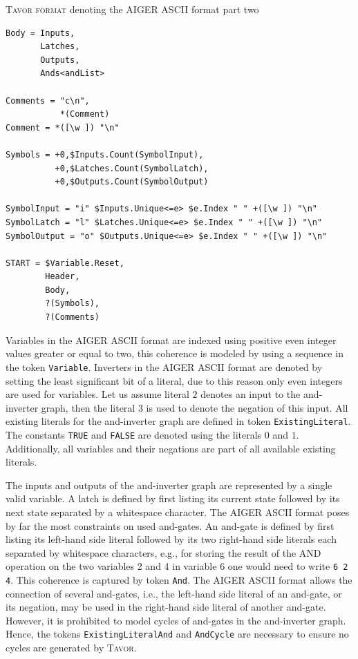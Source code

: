 \begin{listing}
\caption{\textsc{Tavor format} denoting the AIGER ASCII format part two}
\label{lst:tavor-aiger-ascii-format-2}
\begin{verbatim}
Body = Inputs,
       Latches,
       Outputs,
       Ands<andList>

Comments = "c\n",
           *(Comment)
Comment = *([\w ]) "\n"

Symbols = +0,$Inputs.Count(SymbolInput),
          +0,$Latches.Count(SymbolLatch),
          +0,$Outputs.Count(SymbolOutput)

SymbolInput = "i" $Inputs.Unique<=e> $e.Index " " +([\w ]) "\n"
SymbolLatch = "l" $Latches.Unique<=e> $e.Index " " +([\w ]) "\n"
SymbolOutput = "o" $Outputs.Unique<=e> $e.Index " " +([\w ]) "\n"

START = $Variable.Reset,
        Header,
        Body,
        ?(Symbols),
        ?(Comments)
\end{verbatim}
\end{listing}

Variables in the AIGER ASCII format are indexed using positive even integer values greater or equal to two, this coherence is modeled by using a sequence in the token \texttt{Variable}. Inverters in the AIGER ASCII format are denoted by setting the least significant bit of a literal, due to this reason only even integers are used for variables. Let us assume literal $2$ denotes an input to the and-inverter graph, then the literal $3$ is used to denote the negation of this input. All existing literals for the and-inverter graph are defined in token \texttt{ExistingLiteral}. The constants \texttt{TRUE} and \texttt{FALSE} are denoted using the literals $0$ and $1$. Additionally, all variables and their negations are part of all available existing literals.

The inputs and outputs of the and-inverter graph are represented by a single valid variable. A latch is defined by first listing its current state followed by its next state separated by a whitespace character. The AIGER ASCII format poses by far the most constraints on used and-gates. An and-gate is defined by first listing its left-hand side literal followed by its two right-hand side literals each separated by whitespace characters, e.g., for storing the result of the AND operation on the two variables 2 and 4 in variable 6 one would need to write \texttt{6 2 4}. This coherence is captured by token \texttt{And}. The AIGER ASCII format allows the connection of several and-gates, i.e., the left-hand side literal of an and-gate, or its negation, may be used in the right-hand side literal of another and-gate. However, it is prohibited to model cycles of and-gates in the and-inverter graph. Hence, the tokens \texttt{ExistingLiteralAnd} and \texttt{AndCycle} are necessary to ensure no cycles are generated by \textsc{Tavor}.

